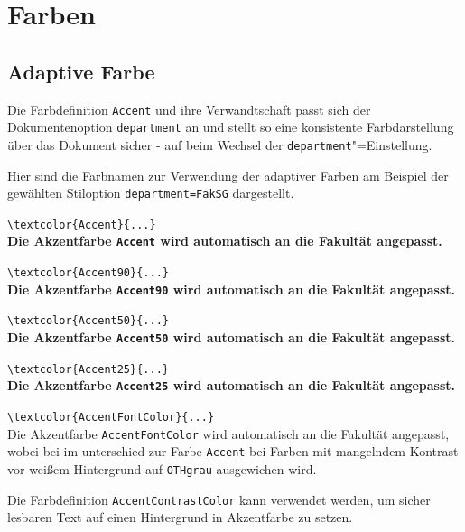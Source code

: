 \section{Farben}\label{Sec:Farben}

\subsection{Adaptive Farbe}

Die Farbdefinition \texttt{Accent} und ihre Verwandtschaft passt sich der Dokumentenoption \verb+department+ an und stellt so eine konsistente Farbdarstellung über das Dokument sicher - auf beim Wechsel der \texttt{department}"=Einstellung.

Hier sind die Farbnamen zur Verwendung der adaptiver Farben am Beispiel der gewählten Stiloption \verb+department=FakSG+ dargestellt.

\verb|\textcolor{Accent}{...}|\\
\textcolor{Accent}{\bfseries Die Akzentfarbe \texttt{Accent} wird automatisch an die Fakultät angepasst.}

\verb|\textcolor{Accent90}{...}|\\
\textcolor{Accent90}{\bfseries Die Akzentfarbe \texttt{Accent90} wird automatisch an die Fakultät angepasst.}

\verb|\textcolor{Accent50}{...}|\\
\textcolor{Accent50}{\bfseries Die Akzentfarbe \texttt{Accent50} wird automatisch an die Fakultät angepasst.}

\verb|\textcolor{Accent25}{...}|\\
\textcolor{Accent25}{\bfseries Die Akzentfarbe \texttt{Accent25} wird automatisch an die Fakultät angepasst.}

\verb|\textcolor{AccentFontColor}{...}|\\
\textcolor{AccentFontColor}{Die Akzentfarbe \texttt{AccentFontColor} wird automatisch an die Fakultät angepasst, wobei bei im unterschied zur Farbe \texttt{Accent} bei Farben mit mangelndem Kontrast vor weißem Hintergrund  auf \texttt{OTHgrau} ausgewichen wird.}

\begin{center}
\colorbox{Accent}{\begin{minipage}{.9\linewidth}\color{AccentContrastColor} Die Farbdefinition \texttt{AccentContrastColor} kann verwendet werden, um sicher lesbaren Text auf einen Hintergrund in Akzentfarbe zu setzen.\end{minipage}}
\end{center}

